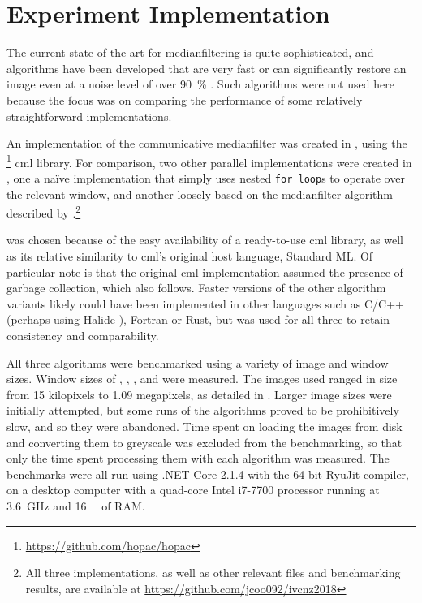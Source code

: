 \section{ Experiment Implementation}

The current state of the art for \gls{medianfilter}ing is quite sophisticated, and algorithms have been developed that are very fast \cite{Sanchez2012,Perrot2014} or can significantly restore an image even at a noise level of over \qty{90}{\percent} \cite{Gao2015,Wu2011}.  Such algorithms were not used here because the focus was on comparing the performance of some relatively straightforward implementations.

An implementation of the communicative \gls{medianfilter} was created in \fsharp{}, using the \hopac{}\footnote{\url{https://github.com/hopac/hopac}} \gls{cml} library.  For comparison, two other parallel implementations were created in \fsharp{}, one a naïve implementation that simply uses nested \texttt{for loop}s to operate over the relevant window, and another loosely based on the \gls{medianfilter} algorithm described by \citeauthor{Braunl2001} \cite{Braunl2001}.\footnote{All three implementations, as well as other relevant files and benchmarking results, are available at \url{https://github.com/jcoo092/ivcnz2018}}

\fsharp{} was chosen because of the easy availability of a ready-to-use \gls{cml} library, as well as its relative similarity to \gls{cml}'s original host language,  Standard ML.  Of particular note is that the original \gls{cml} implementation assumed the presence of garbage collection, which \hopac{} also follows.  Faster versions of the other algorithm variants likely could have been implemented in other languages such as C/C++ (perhaps using Halide \cite{Ragan-Kelley2017}), Fortran or Rust, but \fsharp{} was used for all three to retain consistency and comparability.  

All three algorithms were benchmarked using a variety of image and window sizes.  Window sizes of , , ,  and  were measured.  The images used ranged in size from 15 kilopixels to 1.09 megapixels, as detailed in .  Larger image sizes were initially attempted, but some runs of the algorithms proved to be prohibitively slow, and so they were abandoned.  Time spent on loading the images from disk and converting them to greyscale was excluded from the benchmarking, so that only the time spent processing them with each algorithm was measured.  The benchmarks were all run using .NET Core 2.1.4 with the 64-bit RyuJit compiler, on a desktop computer with a quad-core Intel i7-7700 processor running at \qty{3.6}{\giga\hertz} and \qty{16}{\gibi\byte} of RAM.

